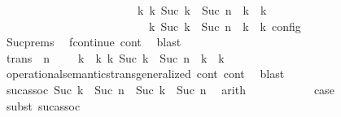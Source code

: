 \begin{isabellebody}
\ \ \ \ \ \ \ \ \ \ \ \ \ \ \ \ \ \ \ \ \ \ \ \ {\isasymhookrightarrow}\isactrlbsup k{\isacharprime}\isactrlesup \ {\isacharparenleft}{\isasymGamma}\isactrlsub k{\isacharprime}{\isacharcomma}\ Suc\ {\isacharparenleft}{\isasymdelta}k\ {\isacharplus}\ Suc\ n{\isacharparenright}\ {\isasymturnstile}\ {\isasymPsi}\isactrlsub k{\isacharprime}\ {\isasymtriangleright}\ {\isasymPhi}\isactrlsub k{\isacharprime}{\isacharparenright}{\isacharparenright}\isanewline
\ \ \ \ \ \ \ \ \ \ \ \ \ \ \ \ \ \ \ \ \ \ {\isasymand}\ {\isasymrho}\ {\isasymin}\ {\isasymlbrakk}\ {\isasymGamma}\isactrlsub k{\isacharprime}{\isacharcomma}\ Suc\ {\isacharparenleft}{\isasymdelta}k\ {\isacharplus}\ Suc\ n{\isacharparenright}\ {\isasymturnstile}\ {\isasymPsi}\isactrlsub k{\isacharprime}\ {\isasymtriangleright}\ {\isasymPhi}\isactrlsub k{\isacharprime}\ {\isasymrbrakk}\isactrlsub c\isactrlsub o\isactrlsub n\isactrlsub f\isactrlsub i\isactrlsub g{\isacartoucheclose}\isanewline
\ \ \ \ \ \ \ \ \ \ \isamarkupfalse%
\ Suc{\isachardot}prems\ \isamarkupfalse%
\ fcontinue\ cont\ \isamarkupfalse%
\ blast\isanewline
\ \ \ \ \ \ \ \ \isamarkupfalse%
\ trans{\isacharcolon}\ {\isacartoucheopen}{\isacharparenleft}{\isasymGamma}{\isacharcomma}\ n\ {\isasymturnstile}\ {\isasymPsi}\ {\isasymtriangleright}\ {\isasymPhi}{\isacharparenright}\ {\isasymhookrightarrow}\isactrlbsup k\ {\isacharplus}\ k{\isacharprime}\isactrlesup \ {\isacharparenleft}{\isasymGamma}\isactrlsub k{\isacharprime}{\isacharcomma}\ Suc\ {\isacharparenleft}{\isasymdelta}k\ {\isacharplus}\ Suc\ n{\isacharparenright}\ {\isasymturnstile}\ {\isasymPsi}\isactrlsub k{\isacharprime}\ {\isasymtriangleright}\ {\isasymPhi}\isactrlsub k{\isacharprime}{\isacharparenright}{\isacartoucheclose}\isanewline
\ \ \ \ \ \ \ \ \ \ \isamarkupfalse%
\ operational{\isacharunderscore}semantics{\isacharunderscore}trans{\isacharunderscore}generalized\ cont\ cont{}\ \isamarkupfalse%
\ blast\isanewline
\ \ \ \ \ \ \ \ \isamarkupfalse%
\ \isamarkupfalse%
\ suc{\isacharunderscore}assoc{\isacharcolon}\ {\isacartoucheopen}Suc\ {\isasymdelta}k\ {\isacharplus}\ Suc\ n\ {\isacharequal}\ Suc\ {\isacharparenleft}{\isasymdelta}k\ {\isacharplus}\ Suc\ n{\isacharparenright}{\isacartoucheclose}\ \isamarkupfalse%
\ arith\isanewline
\ \ \ \ \ \ \ \ \isamarkupfalse%
\ \isamarkupfalse%
\ {\isacharquery}case\isanewline
\ \ \ \ \ \ \ \ \ \ \isamarkupfalse%
\ {\isacharparenleft}subst\ suc{\isacharunderscore}assoc{\isacharparenright}\isanewline

\end{isabellebody}
